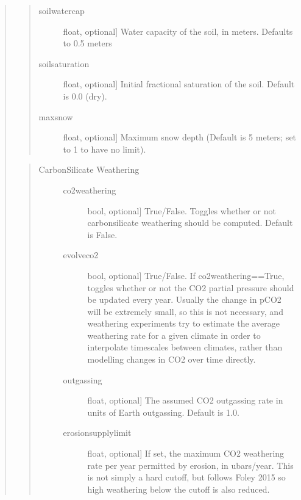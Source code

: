 \documentclass[letterpaper,10pt,english]{sphinxmanual}
\begin{document}
\begin{fulllineitems}
\begin{fulllineitems}
\begin{quote}
\begin{quote}
\begin{description}
\item[{soilwatercap}] \leavevmode{[}float, optional{]}
Water capacity of the soil, in meters. Defaults to 0.5 meters

\item[{soilsaturation}] \leavevmode{[}float, optional{]}
Initial fractional saturation of the soil. Default is 0.0 (dry).

\item[{maxsnow}] \leavevmode{[}float, optional{]}
Maximum snow depth (Default is 5 meters; set to \sphinxhyphen{}1 to have no limit).

\end{description}
\end{quote}

\begin{quote}
\begin{description}
\item[{Carbon\sphinxhyphen{}Silicate Weathering}] \leavevmode\begin{description}
\item[{co2weathering}] \leavevmode{[}bool, optional{]}
True/False. Toggles whether or not carbon\sphinxhyphen{}silicate weathering should be
computed. Default is False.

\item[{evolveco2}] \leavevmode{[}bool, optional{]}
True/False. If co2weathering==True, toggles whether or not the CO2 partial
pressure should be updated every year. Usually the change in pCO2 will be
extremely small, so this is not necessary, and weathering experiments try
to estimate the average weathering rate for a given climate in order to
interpolate timescales between climates, rather than modelling changes in CO2
over time directly.

\item[{outgassing}] \leavevmode{[}float, optional{]}
The assumed CO2 outgassing rate in units of Earth outgassing. Default is 1.0.

\item[{erosionsupplylimit}] \leavevmode{[}float, optional{]}
If set, the maximum CO2 weathering rate per year permitted by
erosion, in ubars/year. This is not simply a hard cutoff, but follows
Foley 2015 so high weathering below the cutoff is also reduced.

\end{description}

\end{description}
\end{quote}


\end{quote}
\end{fulllineitems}
\end{fulllineitems}
\end{document}
